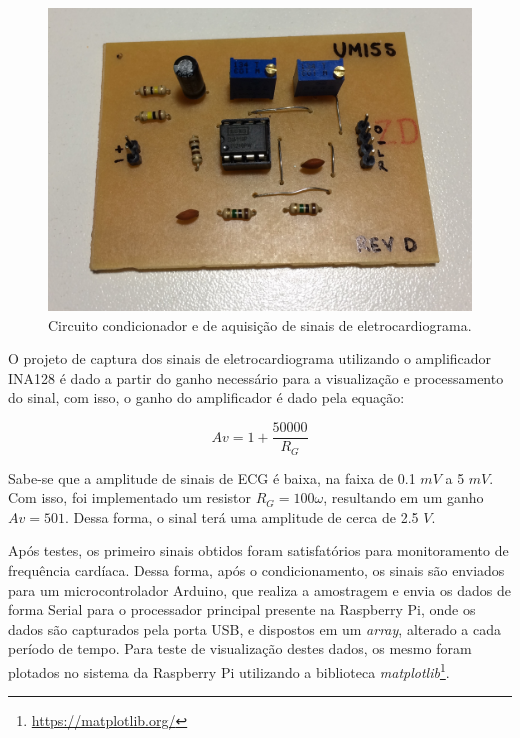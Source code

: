 \begin{figure}[h!]
    \begin{center}
        \includegraphics[scale=0.1]{figuras/ecg_circ.jpg}
    \end{center}
    \caption{Circuito condicionador e de aquisição de sinais de eletrocardiograma.}
    \label{fig:ecg_ele}
\end{figure}

O projeto de captura dos sinais de eletrocardiograma utilizando o amplificador INA128
é dado a partir do ganho necessário para a visualização e processamento do sinal, com isso,
o ganho do amplificador é dado pela equação:

\begin{equation}
  Av = 1 + \frac{50000}{R_{G}}
\end{equation}

Sabe-se que a amplitude de sinais de ECG é baixa, na faixa de 0.1 $mV$ a 5 $mV$.
Com isso, foi implementado um resistor $R_{G} = 100 \omega$, resultando em um ganho
$Av = 501$. Dessa forma, o sinal terá uma amplitude de cerca de 2.5 $V$.

Após testes, os primeiro sinais obtidos foram satisfatórios para monitoramento de frequência
cardíaca. Dessa forma, após o condicionamento, os sinais são enviados para um microcontrolador Arduino,
que realiza a amostragem e envia os dados de forma Serial para o processador principal presente na
Raspberry Pi, onde os dados são capturados pela porta USB, e dispostos em um \textit{array}, alterado
a cada período de tempo. Para teste de visualização destes dados, os mesmo foram plotados no sistema
da Raspberry Pi utilizando a biblioteca \textit{matplotlib}\footnote{\url{https://matplotlib.org/}}.

